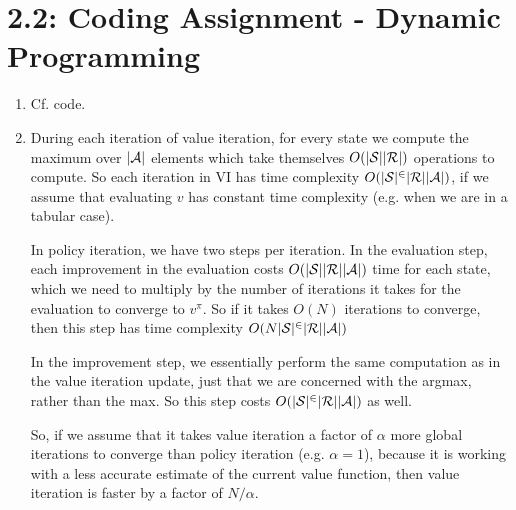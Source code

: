 \documentclass{article}
\begin{document}
\section*{2.2: Coding Assignment - Dynamic Programming}
\begin{enumerate}[label*=\arabic*.]
\item
Cf. code.

\item

During each iteration of value iteration, for every state we compute the maximum over $|\cal A|$ elements which take themselves $O(|\cal S||\cal R|)$ operations to compute. So each iteration in VI has time complexity $O(|\cal S|^2|\cal R||\cal A|)$, if we assume that evaluating $v$ has constant time complexity (e.g. when we are in a tabular case).

In policy iteration, we have two steps per iteration.
In the evaluation step, each improvement in the evaluation costs $O( |\cal S||\cal R||\cal A|)$ time for each state, which we need to multiply by the number of iterations it takes for the evaluation to converge to $v^\pi$. So if it takes $O(N)$ iterations to converge, then this step has time complexity $O(N|\cal S|^2|\cal R||\cal A|)$

In the improvement step, we essentially perform the same computation as in the value iteration update, just that we are concerned with the argmax, rather than the max. So this step costs $O(|\cal S|^2|\cal R||\cal A|)$ as well.

So, if we assume that it takes value iteration a factor of $\alpha$ more global iterations to converge than policy iteration (e.g. $\alpha = 1$), because it is working with a less accurate estimate of the current value function, then value iteration is faster by a factor of $N/\alpha$.

\end{enumerate}
\end{document}
